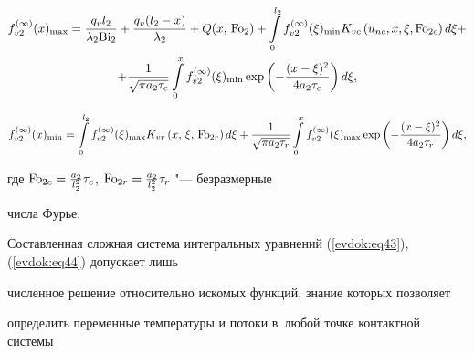 \begin{multline}

\label{evdok:eq43}

 f_{v2}^{(\infty )} (x)_{\max } = \frac{q_v l_2 }{\lambda _2 {\rm Bi}_2 } + 

\frac{q_v (l_2 - x)}{\lambda _2 } + 

Q(x,\, {\rm Fo}_2)+

\int\limits_0^{l_2 } {f_{v2}^{(\infty )} 

(\xi )_{\min } K_{vc} } \left( {u_{nc} ,x,\xi ,{\rm Fo}_{2c} } \right)d\xi + \\ 

 + \frac{1}{\sqrt {\pi a_2 \tau _c } 

}\int\limits_0^x {f_{v2}^{(\infty )} (\xi )_{\min } } \exp \left( { - 

\frac{(x - \xi )^2}{4a_2 \tau _c }} \right)d\xi,

\end{multline}



\vspace{-4mm}



\begin{multline}

\label{evdok:eq44}

 f_{v2}^{(\infty )} (x)_{\min } = \int\limits_0^{l_2 } {f_{v2}^{(\infty )} 

(\xi )_{\max } K_{vr} } \left( x,\, \xi,\, {\rm Fo}_{2r}  \right)d\xi

  + \frac{1}{\sqrt {\pi a_2 \tau _r } 

}\int\limits_0^x {f_{v2}^{(\infty )} (\xi )_{\max } } \exp \left( { - 

\frac{(x - \xi )^2}{4a_2 \tau _r }} \right)d\xi,

\end{multline}

где ${\rm Fo}_{2c} = \frac{a_2 }{l_2^2 }\tau _c$, ${\rm Fo}_{2r} = \frac{a_2 }{l_2^2 }\tau _r $ "--- безразмерные 

числа Фурье. 



Составленная сложная система интегральных уравнений (\ref{evdok:eq43}), (\ref{evdok:eq44}) допускает лишь 

численное решение относительно искомых функций, знание которых позволяет 

определить переменные температуры и потоки в~любой точке контактной системы 

